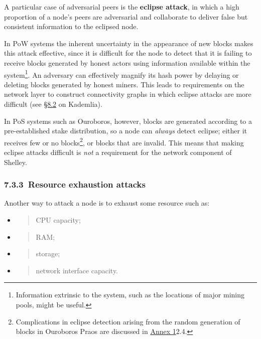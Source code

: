 \documentclass[]{article}
\begin{document}
A particular case of adversarial peers is the \textbf{eclipse attack},
in which a high proportion of a node's peers are adversarial and
collaborate to deliver false but consistent information to the eclipsed
node.

In PoW systems the inherent uncertainty in the appearance of new blocks
makes this attack effective, since it is difficult for the node to
detect that it is failing to receive blocks generated by honest actors
using information available within the system\footnote{Information
  extrinsic to the system, such as the locations of major mining pools,
  might be useful.}. An adversary can effectively magnify its hash power
by delaying or deleting blocks generated by honest miners. This leads to
requirements on the network layer to construct connectivity graphs in
which eclipse attacks are more difficult (see
\protect\hyperlink{kademlia}{{§8.2}} on Kademlia).

In PoS systems such as Ouroboros, however, blocks are generated
according to a pre-established stake distribution, so a node can
\emph{always} detect eclipse; either it receives few or no
blocks\footnote{Complications in eclipse detection arising from the
  random generation of blocks in Ouroboros Praos are discussed in
  \protect\hyperlink{distribution-of-leadership}{{Annex 1}}2.4.}, or
blocks that are invalid. This means that making eclipse attacks
difficult is \emph{not} a requirement for the network component of
Shelley.

\hypertarget{resource-exhaustion-attacks}{%
\subsubsection{​7.3.3​~Resource exhaustion
attacks}\label{resource-exhaustion-attacks}}

Another way to attack a node is to exhaust some resource such as:

\begin{itemize}
\item
  \begin{quote}
  CPU capacity;
  \end{quote}
\item
  \begin{quote}
  RAM;
  \end{quote}
\item
  \begin{quote}
  storage;
  \end{quote}
\item
  \begin{quote}
  network interface capacity.
  \end{quote}
\end{itemize}
\end{document}
